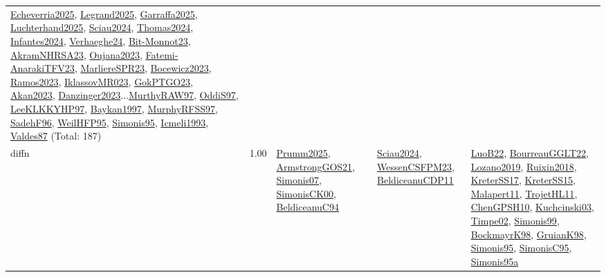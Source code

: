 {\begin{longtable}{p{3cm}r>{\raggedright\arraybackslash}p{6cm}>{\raggedright\arraybackslash}p{6cm}>{\raggedright\arraybackslash}p{8cm}}
\hyperref[detail:Echeverria2025]{Echeverria2025}, \hyperref[detail:Legrand2025]{Legrand2025}, \hyperref[detail:Garraffa2025]{Garraffa2025}, \hyperref[detail:Luchterhand2025]{Luchterhand2025}, \hyperref[detail:Sciau2024]{Sciau2024}, \hyperref[detail:Thomas2024]{Thomas2024}, \hyperref[detail:Infantes2024]{Infantes2024}, \hyperref[detail:Verhaeghe24]{Verhaeghe24}, \hyperref[detail:Bit-Monnot23]{Bit-Monnot23}, \hyperref[detail:AkramNHRSA23]{AkramNHRSA23}, \hyperref[detail:Oujana2023]{Oujana2023}, \hyperref[detail:Fatemi-AnarakiTFV23]{Fatemi-AnarakiTFV23}, \hyperref[detail:MarliereSPR23]{MarliereSPR23}, \hyperref[detail:Bocewicz2023]{Bocewicz2023}, \hyperref[detail:Ramos2023]{Ramos2023}, \hyperref[detail:IklassovMR023]{IklassovMR023}, \hyperref[detail:GokPTGO23]{GokPTGO23}, \hyperref[detail:Akan2023]{Akan2023}, \hyperref[detail:Danzinger2023]{Danzinger2023}...\hyperref[detail:MurthyRAW97]{MurthyRAW97}, \hyperref[detail:OddiS97]{OddiS97}, \hyperref[detail:LeeKLKKYHP97]{LeeKLKKYHP97}, \hyperref[detail:Baykan1997]{Baykan1997}, \hyperref[detail:MurphyRFSS97]{MurphyRFSS97}, \hyperref[detail:SadehF96]{SadehF96}, \hyperref[detail:WeilHFP95]{WeilHFP95}, \hyperref[detail:Simonis95]{Simonis95}, \hyperref[detail:Icmeli1993]{Icmeli1993}, \hyperref[detail:Valdes87]{Valdes87} (Total: 187)\\
\index{diffn}\index{Constraints!diffn}diffn &  1.00 & \hyperref[detail:Prumm2025]{Prumm2025}, \hyperref[detail:ArmstrongGOS21]{ArmstrongGOS21}, \hyperref[detail:Simonis07]{Simonis07}, \hyperref[detail:SimonisCK00]{SimonisCK00}, \hyperref[detail:BeldiceanuC94]{BeldiceanuC94} & \hyperref[detail:Sciau2024]{Sciau2024}, \hyperref[detail:WessenCSFPM23]{WessenCSFPM23}, \hyperref[detail:BeldiceanuCDP11]{BeldiceanuCDP11} & \hyperref[detail:LuoB22]{LuoB22}, \hyperref[detail:BourreauGGLT22]{BourreauGGLT22}, \hyperref[detail:Lozano2019]{Lozano2019}, \hyperref[detail:Ruixin2018]{Ruixin2018}, \hyperref[detail:KreterSS17]{KreterSS17}, \hyperref[detail:KreterSS15]{KreterSS15}, \hyperref[detail:Malapert11]{Malapert11}, \hyperref[detail:TrojetHL11]{TrojetHL11}, \hyperref[detail:ChenGPSH10]{ChenGPSH10}, \hyperref[detail:Kuchcinski03]{Kuchcinski03}, \hyperref[detail:Timpe02]{Timpe02}, \hyperref[detail:Simonis99]{Simonis99}, \hyperref[detail:BockmayrK98]{BockmayrK98}, \hyperref[detail:GruianK98]{GruianK98}, \hyperref[detail:Simonis95]{Simonis95}, \hyperref[detail:SimonisC95]{SimonisC95}, \hyperref[detail:Simonis95a]{Simonis95a}\\

\end{longtable}}
